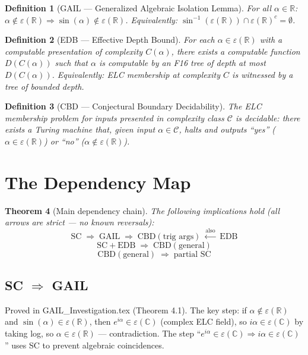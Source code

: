 \documentclass[11pt]{article}
\newtheorem{theorem}{Theorem}
\newtheorem{definition}[theorem]{Definition}
\begin{document}
\begin{definition}[GAIL — Generalized Algebraic Isolation Lemma]
For all $\alpha \in \mathbb{R}$: $\alpha \notin \varepsilon(\mathbb{R}) \Rightarrow \sin(\alpha) \notin \varepsilon(\mathbb{R})$.
Equivalently: $\sin^{-1}(\varepsilon(\mathbb{R})) \cap \varepsilon(\mathbb{R})^c = \emptyset$.
\end{definition}

\begin{definition}[EDB — Effective Depth Bound]
For each $\alpha \in \varepsilon(\mathbb{R})$ with a computable presentation of complexity $C(\alpha)$,
there exists a computable function $D(C(\alpha))$ such that $\alpha$ is computable
by an F16 tree of depth at most $D(C(\alpha))$.
Equivalently: ELC membership at complexity $C$ is witnessed by a tree of bounded depth.
\end{definition}

\begin{definition}[CBD — Conjectural Boundary Decidability]
The ELC membership problem for inputs presented in complexity class $\mathcal{C}$
is decidable: there exists a Turing machine that, given input $\alpha \in \mathcal{C}$,
halts and outputs ``yes'' ($\alpha \in \varepsilon(\mathbb{R})$) or ``no'' ($\alpha \notin \varepsilon(\mathbb{R})$).
\end{definition}

\section{The Dependency Map}

\begin{theorem}[Main dependency chain]
\label{thm:chain}
The following implications hold (all arrows are strict — no known reversals):
\[
\mathrm{SC} \;\Rightarrow\; \mathrm{GAIL} \;\Rightarrow\;
\mathrm{CBD}(\text{trig args}) \;\xleftarrow{\text{also}}\; \mathrm{EDB}
\]
\[
\mathrm{SC} + \mathrm{EDB} \;\Rightarrow\; \mathrm{CBD}(\text{general})
\]
\[
\mathrm{CBD}(\text{general}) \;\Rightarrow\; \text{partial SC}
\]
\end{theorem}

\subsection{SC $\Rightarrow$ GAIL}

Proved in GAIL\_Investigation.tex (Theorem 4.1).
The key step: if $\alpha \notin \varepsilon(\mathbb{R})$ and $\sin(\alpha) \in \varepsilon(\mathbb{R})$,
then $e^{i\alpha} \in \varepsilon(\mathbb{C})$ (complex ELC field),
so $i\alpha \in \varepsilon(\mathbb{C})$ by taking log,
so $\alpha \in \varepsilon(\mathbb{R})$ — contradiction.
The step ``$e^{i\alpha} \in \varepsilon(\mathbb{C}) \Rightarrow i\alpha \in \varepsilon(\mathbb{C})$''
uses SC to prevent algebraic coincidences.
\end{document}
